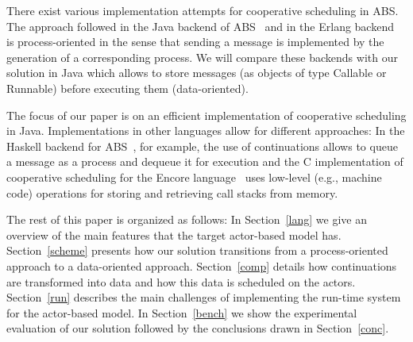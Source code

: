 There exist various implementation attempts for cooperative scheduling in ABS.
The approach followed in the Java backend of ABS~\cite{abs,Schafer} and in the Erlang backend~\cite{Erlang} is process-oriented in the sense that sending a message is implemented by the generation of a corresponding process. We will compare these backends with our solution in Java which allows to store messages (as objects of type Callable or Runnable) before executing them (data-oriented).

The focus of our paper is on an efficient implementation of cooperative scheduling in Java.
Implementations in other languages allow for different approaches:
In the Haskell backend for ABS~\cite{Haskell}, for example, the use of continuations allows
to queue a message as a process and dequeue it for execution and the C implementation of cooperative scheduling for the
Encore language~\cite{Encore} uses low-level (e.g., machine code) operations for
storing and retrieving call stacks from memory.

The rest of this paper is organized as follows: In Section~\ref{lang} we give an overview of the main features that the target actor-based model has. Section~\ref{scheme} presents how our solution transitions from a process-oriented approach to a data-oriented approach. Section~\ref{comp} details how continuations are transformed into data and how this data is scheduled on the actors. Section~\ref{run} describes the main challenges of implementing the run-time system for the actor-based model. In Section~\ref{bench} we show the experimental evaluation of our solution followed by the conclusions drawn in Section~\ref{conc}.






